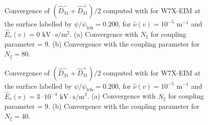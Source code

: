 \begin{figure}[t]
	\centering	
	\begin{subfigure}[t]{0.32\textwidth}
		
		\caption{}
		\label{subfig:DKES_D31_convergence_Legendre_W7X_EIM_0200_Erho_0_Detail}
	\end{subfigure}
	\begin{subfigure}[t]{0.32\textwidth}
		\caption{}
		\label{subfig:DKES_D31_convergence_Coupling_parameter_W7X_EIM_0200_Erho_0}
	\end{subfigure}
	
	
	\caption{Convergence of $(\widehat{D}_{31}^- + \widehat{D}_{31}^+) /2$ computed with {\DKES} for W7X-EIM at the surface labelled by $\psi/\psi_{\text{lcfs}}=0.200$, for $\hat{\nu}(v)=10^{-5}$ $\text{m}^{-1}$ and $\hat{E}_r(v)=0$ $\text{kV}\cdot\text{s}/\text{m}^2$. (a) Convergence with $N_\xi$ for coupling parameter = 9. (b) Convergence with the coupling parameter for $N_\xi= 80$.}
	\label{fig:DKES_Convergence_W7X_EIM_Er_0}
\end{figure}



\begin{figure}[t]
	\centering
	\begin{subfigure}[t]{0.32\textwidth}
		
		\caption{}
		\label{subfig:DKES_D31_convergence_Legendre_W7X_EIM_0200_Erho_3e-4_Detail}
	\end{subfigure}
	\begin{subfigure}[t]{0.32\textwidth}
		\caption{}
		\label{subfig:DKES_D31_convergence_Coupling_parameter_W7X_EIM_0200_Erho_3e-4}
	\end{subfigure}
	
	\caption{Convergence of $(\widehat{D}_{31}^- + \widehat{D}_{31}^+) /2$ computed with {\DKES} for W7X-EIM at the surface labelled by $\psi/\psi_{\text{lcfs}}=0.200$, for $\hat{\nu}(v)=10^{-5}$ $\text{m}^{-1}$ and $\hat{E}_r(v)=3\cdot 10^{-4}$ $\text{kV}\cdot\text{s}/\text{m}^2$. (a) Convergence with $N_\xi$ for coupling parameter = 9. (b) Convergence with the coupling parameter for $N_\xi= 40$.}
	\label{fig:DKES_Convergence_W7X_EIM_Er_3e-4}
\end{figure}


